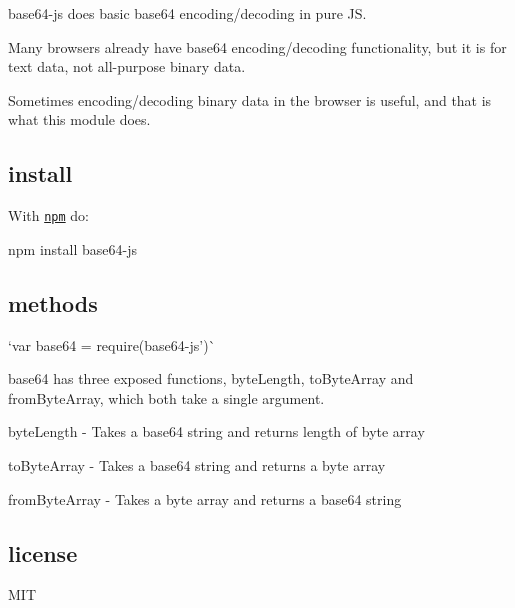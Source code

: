 {\ttfamily base64-\/js} does basic base64 encoding/decoding in pure JS.

\href{http://travis-ci.org/beatgammit/base64-js}{\tt }

\href{https://ci.testling.com/beatgammit/base64-js}{\tt }

Many browsers already have base64 encoding/decoding functionality, but it is for text data, not all-\/purpose binary data.

Sometimes encoding/decoding binary data in the browser is useful, and that is what this module does.

\subsection*{install}

With \href{https://npmjs.org}{\tt npm} do\+:

{\ttfamily npm install base64-\/js}

\subsection*{methods}

`var base64 = require(\textquotesingle{}base64-\/js')\`{}

{\ttfamily base64} has three exposed functions, {\ttfamily byte\+Length}, {\ttfamily to\+Byte\+Array} and {\ttfamily from\+Byte\+Array}, which both take a single argument.


\begin{DoxyItemize}
\item {\ttfamily byte\+Length} -\/ Takes a base64 string and returns length of byte array
\item {\ttfamily to\+Byte\+Array} -\/ Takes a base64 string and returns a byte array
\item {\ttfamily from\+Byte\+Array} -\/ Takes a byte array and returns a base64 string
\end{DoxyItemize}

\subsection*{license}

M\+IT 